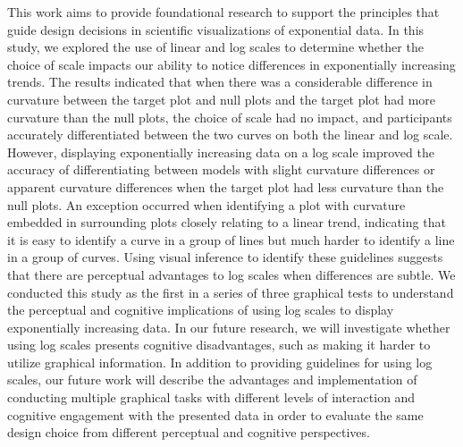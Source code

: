 \documentclass[12pt]{article}
\begin{document}
This work aims to provide foundational research to support the
principles that guide design decisions in scientific visualizations of
exponential data. In this study, we explored the use of linear and log
scales to determine whether the choice of scale impacts our ability to
notice differences in exponentially increasing trends. The results
indicated that when there was a considerable difference in curvature
between the target plot and null plots and the target plot had more
curvature than the null plots, the choice of scale had no impact, and
participants accurately differentiated between the two curves on both
the linear and log scale. However, displaying exponentially increasing
data on a log scale improved the accuracy of differentiating between
models with slight curvature differences or apparent curvature
differences when the target plot had less curvature than the null plots.
An exception occurred when identifying a plot with curvature embedded in
surrounding plots closely relating to a linear trend, indicating that it
is easy to identify a curve in a group of lines but much harder to
identify a line in a group of curves. Using visual inference to identify
these guidelines suggests that there are perceptual advantages to log
scales when differences are subtle. We conducted this study as the first
in a series of three graphical tests to understand the perceptual and
cognitive implications of using log scales to display exponentially
increasing data. In our future research, we will investigate whether
using log scales presents cognitive disadvantages, such as making it
harder to utilize graphical information. In addition to providing
guidelines for using log scales, our future work will describe the
advantages and implementation of conducting multiple graphical tasks
with different levels of interaction and cognitive engagement with the
presented data in order to evaluate the same design choice from
different perceptual and cognitive perspectives.



\end{document}
